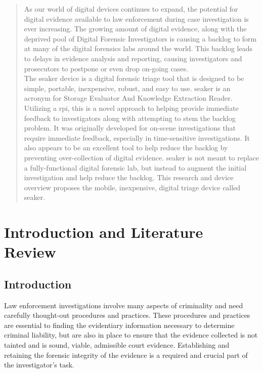 \documentclass[12pt]{article}
\begin{document}
\begin{abstract}
As our world of digital devices continues to expand, the potential for digital evidence available to law
enforcement during case investigation is ever increasing.  The growing amount of digital evidence, along with
the deprived pool of Digital Forensic Investigators is causing a backlog to form at many of the digital
forensics labs around the world.  This backlog leads to delays in evidence analysis and reporting, causing
investigators and prosecutors to postpone or even drop on-going cases.\\

The \gls{seaker} device is a digital forensic triage tool that is designed to be simple, portable, inexpensive,
robust, and easy to use.  \gls{seaker} is an acronym for Storage Evaluator And Knowledge Extraction Reader.  
Utilizing a \gls{rpi}, this is a novel approach to helping provide immediate feedback to investigators
along with attempting to stem the backlog problem.  It was originally developed for on-scene investigations
that require immediate feedback, especially in time-sensitive investigations.  It also appears to be an
excellent tool to help reduce the backlog by preventing over-collection of digital evidence.  \gls{seaker} is not
meant to replace a fully-functional digital forensic lab, but instead to augment the initial investigation
and help reduce the backlog.  This research and device overview proposes the mobile, inexpensive, digital
triage device called \gls{seaker}.
\end{abstract}

\newpage
{}

\tableofcontents

\newpage

\printnoidxglossaries

\newpage

\listoffigures

\newpage

\listoftables

\newpage
{}


\section{Introduction and Literature Review}
\label{sect-IntroAndLitReview}

\subsection{Introduction}
Law enforcement investigations involve many aspects of criminality and need carefully thought-out
procedures and practices.  These procedures and practices are essential to finding the evidentiary
information necessary to determine criminal liability, but are also in place to ensure that the evidence
collected is not tainted and is sound, viable, admissible court evidence.  Establishing and retaining the
forensic integrity of the evidence is a required and crucial part of the investigator's task.\\
\end{document}
